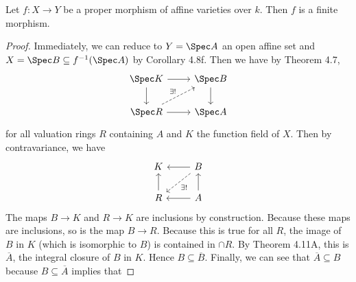 \begin{exercise}
	Let $f: X\to Y $ be a proper morphism of affine varieties over $k $. Then $f $ is a finite morphism.
	\fi
\end{exercise}
\begin{proof}
	Immediately, we can reduce to $Y = \Spec A $ an open affine set and $X = \Spec B \subseteq f^{-1}(\Spec A) $ by Corollary 4.8f.
	Then we have by Theorem 4.7,
	\[
	\begin{tikzcd}
	\Spec K & \Spec B\\
	\Spec R & \Spec A
	\arrow[from=1-1,to=1-2]
	\arrow[from=1-1,to=2-1]
	\arrow[from=2-1,to=2-2]
	\arrow[from=1-2,to=2-2]
	\arrow["\exists !",dashed,from=2-1,to=1-2]
	\end{tikzcd}
	\]
	for all valuation rings $R $ containing $A $ and $K $ the function field of $X $.
	Then by contravariance, we have
	\[
	\begin{tikzcd}
	K & B\\
	R & A
	\arrow[from=1-2,to=1-1]
	\arrow[from=2-1,to=1-1]
	\arrow[from=2-2,to=2-1]
	\arrow[from=2-2,to=1-2]
	\arrow["\exists !",dashed,from=1-2,to=2-1]
	\end{tikzcd}
	\]
	The maps $B\to K $ and $R\to K $ are inclusions by construction.
	Because these maps are inclusions, so is the map $B\to R $.
	Because this is true for all $R $, the image of $B $ in $K $ (which is isomorphic to $B $) is contained in $\cap R $.
	By Theorem 4.11A, this is $\overline{A}  $, the integral closure of $B $ in $K $.
	Hence $B \subseteq \overline{B}  $.
	Finally, we can see that $\overline{A} \subseteq B  $	 because $B \subseteq \overline{A}  $ implies that 
\end{proof}

